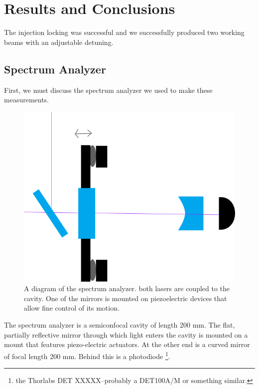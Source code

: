 \chapter{Results and Conclusions}

The injection locking was successful and we successfully produced two working beams with an adjustable detuning. 

\section{Spectrum Analyzer}
First, we must discuss the spectrum analyzer we used to make these measurements. 

\begin{figure}
    \centerline{\includegraphics[totalheight=0.3\textheight ]{spectrumAnalyzer}}
    \caption[]{\label{fig:spectrumAnalyzer}
    A diagram of the spectrum analyzer. both lasers are coupled to the cavity. One of the mirrors is mounted on piezoelectric devices that allow fine control of its motion. 
}
\end{figure}


The spectrum analyzer is a semiconfocal cavity of length 200 mm. The flat, partially reflective mirror through which light enters the cavity is mounted on a mount that features piezo-electric actuators. At the other end is a curved mirror of focal length 200 mm. Behind this is a photodiode \footnote{the Thorlabs DET XXXXX--probably a DET100A/M or something similar.}.

